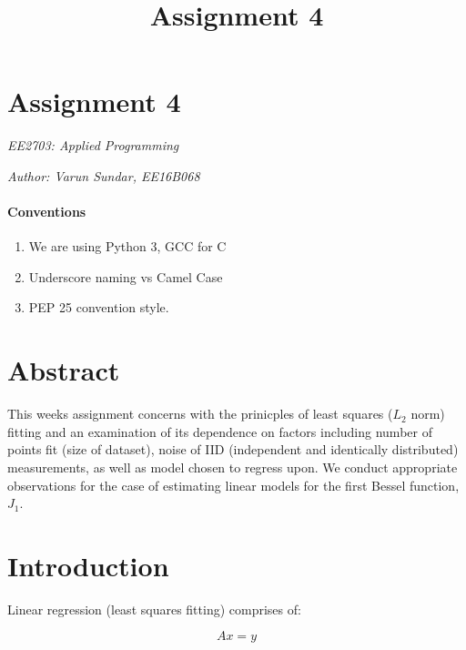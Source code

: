 \documentclass[11pt]{article}
\title{Assignment 4}
\providecommand{\tightlist}{%
      \setlength{\itemsep}{0pt}\setlength{\parskip}{0pt}}
\begin{document}
    
    
    \maketitle
    
    

    
    \hypertarget{assignment-4}{%
\section{Assignment 4}\label{assignment-4}}

\emph{EE2703: Applied Programming}

\emph{Author: Varun Sundar, EE16B068}

\hypertarget{conventions}{%
\paragraph{Conventions}\label{conventions}}

\begin{enumerate}
\def\labelenumi{\arabic{enumi}.}
\tightlist
\item
  We are using Python 3, GCC for C
\item
  Underscore naming vs Camel Case
\item
  PEP 25 convention style.
\end{enumerate}

\hypertarget{abstract}{%
\section{Abstract}\label{abstract}}

This weeks assignment concerns with the prinicples of least squares
(\(L_2\) norm) fitting and an examination of its dependence on factors
including number of points fit (size of dataset), noise of IID
(independent and identically distributed) measurements, as well as model
chosen to regress upon. We conduct appropriate observations for the case
of estimating linear models for the first Bessel function, \(J_1\).

\hypertarget{introduction}{%
\section{Introduction}\label{introduction}}

Linear regression (least squares fitting) comprises of:

\[ Ax=y\]
\end{document}

